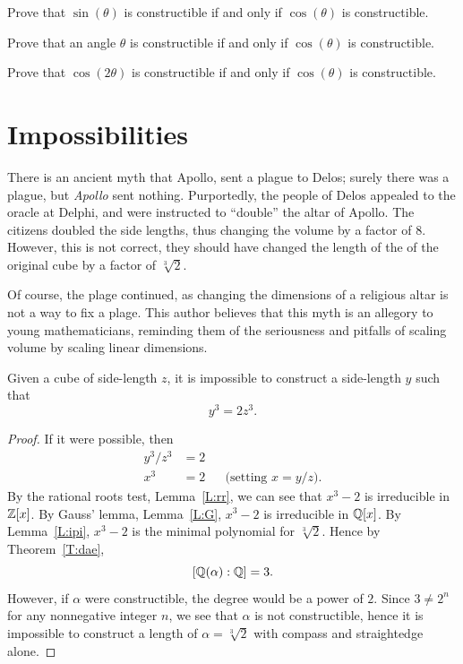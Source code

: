 \documentclass{ximera}
\begin{document}
\begin{exercise}
  Prove that $\sin(\theta)$ is constructible if and only if
  $\cos(\theta)$ is constructible.
\end{exercise}

\begin{exercise}
  Prove that an angle $\theta$ is constructible if and only if
  $\cos(\theta)$ is constructible.
\end{exercise}

\begin{exercise}
  Prove that $\cos(2\theta)$ is constructible if and only if
  $\cos(\theta)$ is constructible.
\end{exercise}

\section{Impossibilities}


There is an ancient myth that Apollo, sent a plague to Delos; surely
there was a plague, but \textit{Apollo} sent nothing. Purportedly, the
people of Delos appealed to the oracle at Delphi, and were instructed
to ``double'' the altar of Apollo. The citizens doubled the side
lengths, thus changing the volume by a factor of $8$. However, this is
not correct, they should have changed the length of the of the
original cube by a factor of $\sqrt[3]{2}$.

Of course, the plage continued, as changing the dimensions of a
religious altar is not a way to fix a plage.  This author believes
that this myth is an allegory to young mathematicians, reminding them
of the seriousness and pitfalls of scaling volume by scaling linear
dimensions.


\begin{example}
Given a cube of side-length $z$, it is impossible to construct a
side-length $y$ such that
\[
y^3 = 2 z^3.
\]
\begin{proof}
  If it were possible, then
  \begin{align*}
    y^3/z^3 &= 2\\
    x^3 &= 2 & & \text{(setting $x=y/z$)}.
  \end{align*}
  By the rational roots test, Lemma~\ref{L:rr}, we can see that $x^3-2$
  is irreducible in $\mathbb Z[x]$. By Gauss' lemma, Lemma~\ref{L:G}, $x^3-2$
  is irreducible in $\mathbb Q[x]$. By Lemma~\ref{L:ipi}, $x^3-2$ is the minimal
  polynomial for $\sqrt[3]{2}$. Hence by Theorem~\ref{T:dae},
  \[
    [\mathbb Q(\alpha):\mathbb Q]=3.
    \]
    However, if $\alpha$ were constructible, the
    degree would be a power of $2$. Since $3\ne 2^n$ for any nonnegative
    integer $n$, we see that $\alpha$ is not constructible, hence it is
    impossible to construct a length of $\alpha = \sqrt[3]{2}$ with
    compass and straightedge alone.
\end{proof}
\end{example}
\end{document}
